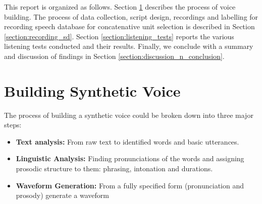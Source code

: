 \documentclass[lettersize,journal]{IEEEtran}
\begin{document}



This report is organized as follows. Section \ref{section:building_syn_voice} describes the process of voice building. The process of data collection, script design, recordings and labelling for  recording speech database for concatenative unit selection is described in Section \ref{section:recording_sd}.  Section \ref{section:listening_tests} reports the various listening tests conducted and their results. Finally, we conclude with a summary and discussion of findings in Section \ref{section:discussion_n_conclusion}.

\section{Building Synthetic Voice}
\label{section:building_syn_voice}
The process of building a synthetic voice could be broken down into three major steps:
\begin{itemize}
    \item \textbf{Text analysis:} From raw text to identified words and basic utterances.
    \item \textbf{Linguistic Analysis:} Finding pronunciations of the words and assigning prosodic structure to them: phrasing, intonation and durations.
    \item \textbf{Waveform Generation:} From a fully specified form (pronunciation and prosody) generate a waveform
\end{itemize}
\end{document}
